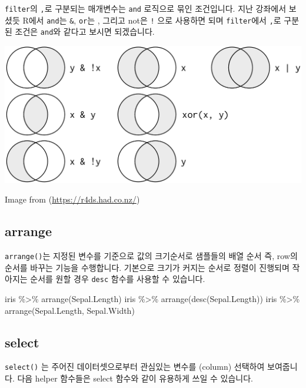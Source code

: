 \documentclass[
]{book}
\newenvironment{Shaded}{\begin{snugshade}}{\end{snugshade}}
\newcommand{\FunctionTok}[1]{\textcolor[rgb]{0.00,0.00,0.00}{#1}}
\newcommand{\NormalTok}[1]{#1}
\newcommand{\SpecialCharTok}[1]{\textcolor[rgb]{0.00,0.00,0.00}{#1}}
\begin{document}
\texttt{filter}의 \texttt{,}로 구분되는 매개변수는 \texttt{and} 로직으로 묶인 조건입니다. 지난 강좌에서 보셨듯 R에서 \texttt{and}는 \texttt{\&}, \texttt{or}는 \texttt{\textbar{}}, 그리고 not은 \texttt{!} 으로 사용하면 되며 \texttt{filter}에서 \texttt{,}로 구분된 조건은 \texttt{and}와 같다고 보시면 되겠습니다.

\includegraphics{images/07/03.png}

Image from (\url{https://r4ds.had.co.nz/})

\hypertarget{arrange}{%
\subsection{arrange}\label{arrange}}

\texttt{arrange()}는 지정된 변수를 기준으로 값의 크기순서로 샘플들의 배열 순서 즉, row의 순서를 바꾸는 기능을 수행합니다. 기본으로 크기가 커지는 순서로 정렬이 진행되며 작아지는 순서를 원할 경우 \texttt{desc} 함수를 사용할 수 있습니다.

\begin{Shaded}
\begin{Highlighting}[]
\NormalTok{iris }\SpecialCharTok{\%\textgreater{}\%} \FunctionTok{arrange}\NormalTok{(Sepal.Length)}
\NormalTok{iris }\SpecialCharTok{\%\textgreater{}\%} \FunctionTok{arrange}\NormalTok{(}\FunctionTok{desc}\NormalTok{(Sepal.Length))}
\NormalTok{iris }\SpecialCharTok{\%\textgreater{}\%} \FunctionTok{arrange}\NormalTok{(Sepal.Length, Sepal.Width)}
\end{Highlighting}
\end{Shaded}

\hypertarget{select}{%
\subsection{select}\label{select}}

\texttt{select()} 는 주어진 데이터셋으로부터 관심있는 변수를 (column) 선택하여 보여줍니다. 다음 helper 함수들은 select 함수와 같이 유용하게 쓰일 수 있습니다.
\end{document}
